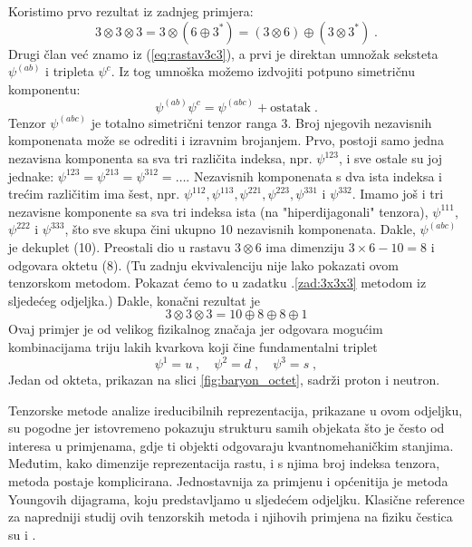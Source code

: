 \begin{primjer}
Koristimo prvo rezultat iz zadnjeg primjera:
\begin{equation}
3\otimes 3\otimes 3 = 3 \otimes (6 \oplus 3^*)
= (3 \otimes 6) \oplus (3 \otimes 3^*) \;.
\end{equation}
Drugi član već znamo iz (\ref{eq:rastav3c3}), a prvi je
direktan umnožak seksteta $\psi^{(ab)}$ i tripleta $\psi^{c}$.
Iz tog umnoška možemo izdvojiti potpuno simetričnu komponentu:
\begin{equation}
\psi^{(ab)}\psi^{c} = \psi^{(abc)} + \text{ostatak} \;. 
\label{eq:6x3}
\end{equation}
Tenzor $\psi^{(abc)}$ je totalno simetrični
tenzor ranga 3. Broj njegovih nezavisnih komponenata može
se odrediti i izravnim brojanjem. Prvo, postoji
samo jedna nezavisna komponenta sa sva tri različita
indeksa, npr. $\psi^{123}$, i sve ostale su joj jednake:
$\psi^{123} = \psi^{213} = \psi^{312} = \ldots$. Nezavisnih komponenata
s dva ista indeksa i trećim različitim ima šest, npr.
$\psi^{112}, \psi^{113}, \psi^{221}, \psi^{223},
\psi^{331}$ i $\psi^{332}$. Imamo još i tri nezavisne
komponente sa sva tri indeksa ista (na "hiperdijagonali"
tenzora), $\psi^{111}$, $\psi^{222}$ i $\psi^{333}$, što sve skupa
čini ukupno 10 nezavisnih komponenata. Dakle, $\psi^{(abc)}$ je
dekuplet (10). Preostali dio u rastavu $3 \otimes 6$ ima
dimenziju $3\times6-10=8$ i odgovara oktetu (8). (Tu
zadnju ekvivalenciju nije lako pokazati ovom tenzorskom
metodom. Pokazat ćemo to u zadatku \thechapter.\ref{zad:3x3x3} 
metodom iz sljedećeg odjeljka.)
Dakle, konačni rezultat je
\begin{equation}
 3 \otimes 3 \otimes 3 = 10 \oplus 8 \oplus 8 \oplus 1
\label{eq:3x3x3}
\end{equation}
Ovaj primjer je od velikog fizikalnog značaja jer odgovara
mogućim kombinacijama triju lakih kvarkova koji čine
fundamentalni  triplet
\begin{equation}
 \psi^{1}=u\;, \quad \psi^{2}=d \;, \quad \psi^{3} = s \;,
\end{equation}
Jedan od okteta, prikazan na slici \ref{fig:baryon_octet}, sadrži 
proton i neutron.
\end{primjer}

Tenzorske metode analize  ireducibilnih reprezentacija, prikazane
u ovom odjeljku, su pogodne jer istovremeno pokazuju strukturu samih
 objekata što je često od interesa u primjenama, gdje ti objekti
odgovaraju kvantnomehaničkim stanjima. Međutim, kako
dimenzije reprezentacija rastu, i s njima broj indeksa tenzora,
metoda postaje komplicirana. Jednostavnija za primjenu i općenitija
je metoda Youngovih dijagrama, koju predstavljamo u 
sljedećem odjeljku. Klasične reference za napredniji studij ovih
tenzorskih metoda i njihovih primjena na fiziku čestica
su \cite{Coleman:1985} i \cite{Georgi:1999}.


